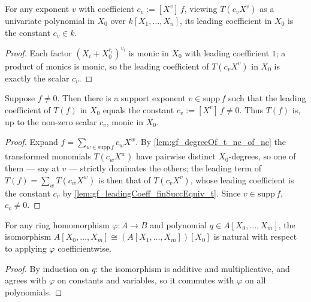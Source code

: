 \begin{lemma}
  \label{lem:gf_leadingCoeff_finSuccEquiv_t}
  For any exponent \(v\) with coefficient \(c_v := [X^v]\,f\), viewing \(T(c_v X^v)\) as a
  univariate polynomial in \(X_0\) over \(k[X_1, \dots, X_n]\), its leading coefficient in
  \(X_0\) is the constant \(c_v \in k\).
\end{lemma}
\begin{proof}
  \leanok
  Each factor \((X_i + X_0^{r_i})^{v_i}\) is monic in \(X_0\) with leading coefficient
  \(1\); a product of monics is monic, so the leading coefficient of \(T(c_v X^v)\) in
  \(X_0\) is exactly the scalar \(c_v\).
\end{proof}

\begin{lemma}
  \label{lem:gf_T_leadingcoeff_eq}
  Suppose \(f \ne 0\). Then there is a support exponent \(v \in \mathrm{supp}\,f\) such that
  the leading coefficient of \(T(f)\) in \(X_0\) equals the constant \(c_v := [X^v]\,f \ne 0\).
  Thus \(T(f)\) is, up to the non-zero scalar \(c_v\), monic in \(X_0\).
\end{lemma}
\begin{proof}
  \leanok
  Expand \(f = \sum_{w \in \mathrm{supp}\,f} c_w X^w\). By \cref{lem:gf_degreeOf_t_ne_of_ne}
  the transformed monomials \(T(c_w X^w)\) have pairwise distinct \(X_0\)-degrees, so one of
  them — say at \(v\) — strictly dominates the others; the leading term of
  \(T(f) = \sum_w T(c_w X^w)\) is then that of \(T(c_v X^v)\), whose leading coefficient is
  the constant \(c_v\) by \cref{lem:gf_leadingCoeff_finSuccEquiv_t}. Since
  \(v \in \mathrm{supp}\,f\), \(c_v \ne 0\).
\end{proof}

\begin{lemma}
  \label{lem:gf_finSuccEquiv_map_comm}
  For any ring homomorphism \(\varphi : A \to B\) and polynomial \(q \in A[X_0, \dots, X_m]\),
  the isomorphism \(A[X_0, \dots, X_m] \cong (A[X_1, \dots, X_m])[X_0]\) is natural with
  respect to applying \(\varphi\) coefficientwise.
\end{lemma}
\begin{proof}

\leanok
  By induction on \(q\): the isomorphism is additive and multiplicative, and agrees with
  \(\varphi\) on constants and variables, so it commutes with \(\varphi\) on all polynomials.
\end{proof}


